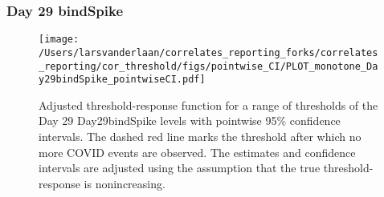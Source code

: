 \documentclass[]{article}
\begin{document}
\clearpage
\clearpage

\clearpage

\hypertarget{day-29-bindspike-1}{%
\subsubsection{Day 29 bindSpike}\label{day-29-bindspike-1}}

\begin{figure}[H]
\centering
\texttt{[image: /Users/larsvanderlaan/correlates\_reporting\_forks/correlates\_reporting/cor\_threshold/figs/pointwise\_CI/PLOT\_monotone\_Day29bindSpike\_pointwiseCI.pdf]}
\caption{Adjusted threshold-response function for a range of thresholds of the
  Day 29 Day29bindSpike levels with pointwise 95\% confidence intervals. The dashed red line marks the threshold after which no more COVID events are observed. The estimates and confidence intervals are adjusted using the assumption that the true threshold-response is nonincreasing.}
\end{figure}
\end{document}
